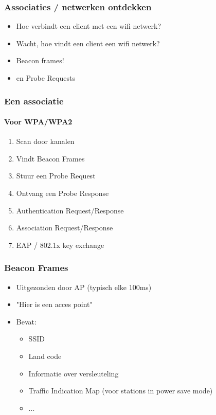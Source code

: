 \documentclass{beamer}
\begin{document}
  \begin{frame}

  \begin{frame}
    \frametitle{Associaties / netwerken ontdekken}

    \begin{itemize}
      \item Hoe verbindt een client met een wifi netwerk?
        \pause
      \item Wacht, hoe vindt een client een wifi netwerk?
        \pause
      \item Beacon frames!
        \pause
      \item en Probe Requests
    \end{itemize}
  \end{frame}

  \begin{frame}
    \frametitle{Een associatie}
    \framesubtitle{Voor WPA/WPA2}

    \begin{enumerate}
      \item Scan door kanalen
        \pause
      \item Vindt Beacon Frames
        \pause
      \item Stuur een Probe Request
        \pause
      \item Ontvang een Probe Response
        \pause
      \item Authentication Request/Response
      \item Association Request/Response
        \pause
      \item EAP / 802.1x key exchange
    \end{enumerate}
  \end{frame}

  \begin{frame}
    \frametitle{Beacon Frames}
    \begin{itemize}
      \item Uitgezonden door AP (typisch elke 100ms)
      \item "Hier is een acces point"
      \item Bevat:
        \begin{itemize}
          \item SSID
          \item Land code
          \item Informatie over versleuteling
          \item Traffic Indication Map (voor stations in power save mode)
          \item ...
        \end{itemize}
    \end{itemize}
  \end{frame}


\end{frame}
\end{document}

